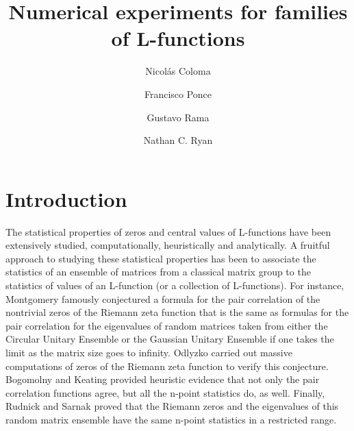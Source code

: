 \documentclass[11pt]{amsart}
\begin{document}
\title{Numerical experiments for families of L-functions}

\author{Nicol\'as Coloma}
\address{Universidad San Francisco de Quito, Cumbay\'a, Ecuador}

\author{Francisco Ponce}
\address{Universidad San Francisco de Quito, Cumbay\'a, Ecuador}

\author{Gustavo Rama}
\address{Universidad de la Rep\'ublica, Montevideo, Uruguay}

\author{Nathan C. Ryan}
\address{Bucknell University, Lewisburg, Pennsylvania, USA}



\maketitle

\section{Introduction}

The statistical properties of zeros and central values of L-functions have been extensively studied, computationally, heuristically and analytically.  A fruitful approach to studying these statistical properties has been to associate the statistics of an ensemble of matrices from a classical matrix group to the statistics of values of an L-function (or a collection of L-functions).  For instance, Montgomery \cite{montgomery} famously conjectured a formula for the pair correlation of the nontrivial zeros of the Riemann zeta function that is the same as formulas for the pair correlation for the eigenvalues of random matrices taken from either the Circular Unitary Ensemble or the Gaussian Unitary Ensemble if one takes the limit as the matrix size goes to infinity.  Odlyzko \cite{odlyzko} carried out massive computations of zeros of the Riemann zeta function to verify this conjecture.  Bogomolny and Keating \cite{bogomolnykeating1,bogomolnykeating2} provided heuristic evidence that not only the pair correlation functions agree, but all the n-point statistics do, as well.  Finally, Rudnick and Sarnak \cite{rudnicksarnak} proved that the Riemann zeros and the eigenvalues of this random matrix ensemble have the same n-point statistics in a restricted range.  
\end{document}
